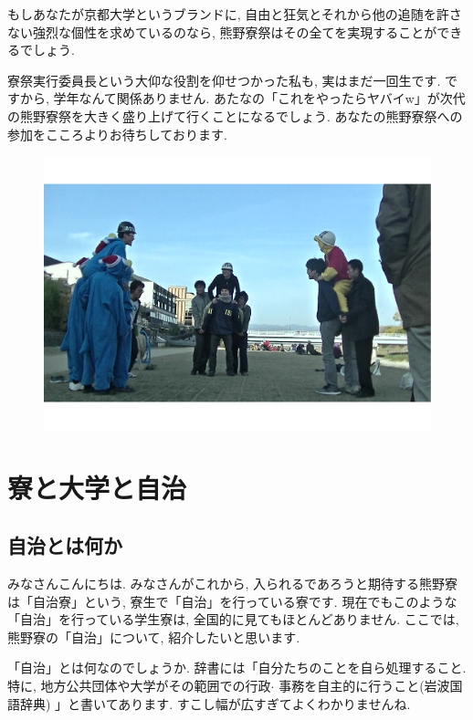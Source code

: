\documentclass[10pt,b5jsbook,dvips,dvipdfmx,openany]{jsbook}
\theoremstyle{definition}
\begin{document}
			もしあなたが京都大学というブランドに, 自由と狂気とそれから他の追随を許さない強烈な個性を求めているのなら, 熊野寮祭はその全てを実現することができるでしょう.

			寮祭実行委員長という大仰な役割を仰せつかった私も, 実はまだ一回生です. ですから, 学年なんて関係ありません. あたなの「これをやったらヤバイw」が次代の熊野寮祭を大きく盛り上げて行くことになるでしょう.
あなたの熊野寮祭への参加をこころよりお待ちしております.
\begin{figure}[h]
		\begin{flushleft}
 	 	\includegraphics[scale=0.25]{kibasen.pdf}
		\end{flushleft}
		\end{figure}




\chapter{寮と大学と自治}

	\section{自治とは何か}

 	みなさんこんにちは. みなさんがこれから, 入られるであろうと期待する熊野寮は「自治寮」という, 寮生で「自治」を行っている寮です. 現在でもこのような「自治」を行っている学生寮は, 全国的に見てもほとんどありません. ここでは, 熊野寮の「自治」について, 紹介したいと思います.

	「自治」とは何なのでしょうか. 辞書には「自分たちのことを自ら処理すること. 特に, 地方公共団体や大学がその範囲での行政$ \cdot $ 事務を自主的に行うこと(岩波国語辞典) 」と書いてあります. すこし幅が広すぎてよくわかりませんね.
\end{document}
